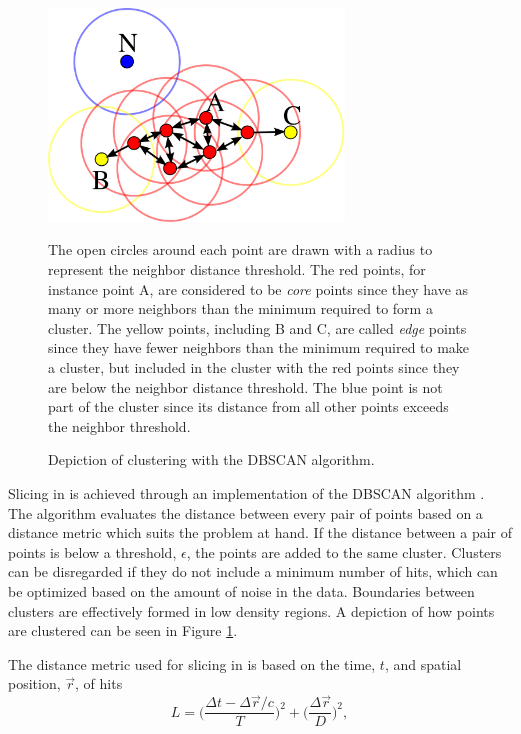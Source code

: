 \begin{figure}[t]
\begin{center}
\includegraphics[width=0.7\textwidth]{figures/figures/dbscan.png}
\end{center}
\caption{Depiction of clustering with the DBSCAN algorithm.}{
The open circles around each point are drawn with a radius to represent the
neighbor distance threshold.
The red points, for instance point A, are
considered to be \textit{core} points since they have as many or more neighbors
than the minimum required to form a cluster.  The yellow points, including B
and C, are called
\textit{edge} points since they have fewer neighbors than the minimum required
to make a cluster, but included in the cluster with the red points since they
are below the neighbor distance threshold.  The blue point is not part of the
cluster since its distance from all other points exceeds the neighbor threshold.
}
\label{dbscan}
\end{figure}

Slicing in \nova is achieved through an implementation of the DBSCAN algorithm
\cite{ester1996density,baird2015thesis}.
The algorithm evaluates the distance between every pair of points based on
a distance metric which suits the problem at hand.
If the distance between a pair of points is below a threshold, $\epsilon$, the
points are added to the same cluster.
Clusters can be disregarded if they do not include a minimum number of hits,
which can be optimized based on the amount of noise in the data.
Boundaries between clusters are effectively formed in low density regions.
A depiction of how points are clustered can be seen in Figure \ref{dbscan}.

The distance metric used for slicing in \nova is based on the time, $t$, and
spatial position, $\vec{r}$, of hits
\begin{equation}
L = \bigg( \frac{\Delta t - \Delta \vec{r} / c }{T} \bigg)^2 +
     \bigg( \frac{\Delta \vec{r}}{D} \bigg)^2,
\end{equation}

